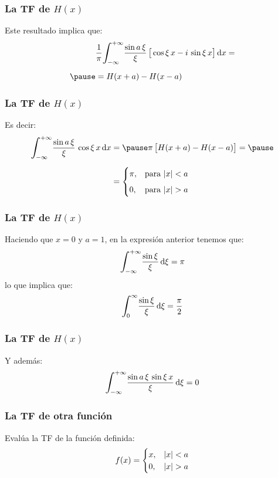 \begin{frame}
\frametitle{La TF de $H (x)$}
Este resultado implica que:
\pause
\begin{eqnarray*}
\begin{aligned}
&\dfrac{1}{\pi} \scaleint{6ex}_{\bs -\infty}^{+\infty} \dfrac{\sin a \, \xi}{\xi} \, \big[ \cos \xi \, x - i \, \sin \xi \, x \big] \dd{x} = \\[0.5em] \pause
&= H (x + a) - H (x - a)
\end{aligned}
\end{eqnarray*}
\end{frame}
\begin{frame}
\frametitle{La TF de $H (x)$}
Es decir:
\pause
\begin{eqnarray*}
\begin{aligned}
\scaleint{6ex}_{\bs -\infty}^{+\infty} \dfrac{\sin a \, \xi}{\xi} \, \cos \xi \, x \dd{x} &= \pause \pi \, \big[ H(x + a) - H(x - a) \big]  = \pause \\[0.5em]
&= \begin{cases}
\pi, & \mbox{para  } \abs{x} < a \\[0.5em]
0, & \mbox{para  } \abs{x} > a
\end{cases}
\end{aligned}
\end{eqnarray*}
\end{frame}
\begin{frame}
\frametitle{La TF de $H (x)$}
Haciendo que $x = 0$ y $a = 1$, en la expresión anterior tenemos que:
\pause
\begin{align*}
\scaleint{6ex}_{\bs -\infty}^{+\infty} \dfrac{\sin \xi}{\xi} \dd{\xi}= \pi
\end{align*}
\pause
lo que implica que:
\pause
\begin{align*}
\scaleint{6ex}_{\bs 0}^{\infty} \dfrac{\sin \xi}{\xi} \dd{\xi}= \dfrac{\pi}{2}
\end{align*}
\end{frame}
\begin{frame}
\frametitle{La TF de $H (x)$}
Y además:
\pause
\begin{align*}
\scaleint{6ex}_{\bs -\infty}^{+\infty} \dfrac{\sin a \, \xi \, \sin \xi \, x}{\xi} \dd{\xi} = 0
\end{align*}
\end{frame}
\begin{frame}
\frametitle{La TF de otra función}
Evalúa la TF de la función definida:
\pause
\begin{align*}
f (x) = \begin{cases}
x, & \abs{x} < a \\
0, & \abs{x} > a
\end{cases}
\end{align*}
\end{frame}
